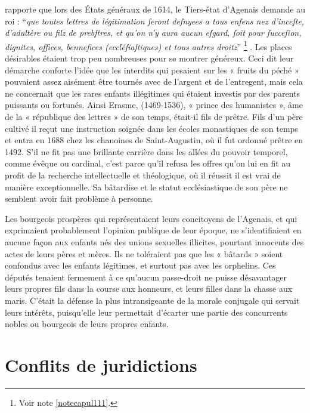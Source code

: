   rapporte que lors des États généraux de 1614, le Tiers-état d'Agenais demande au roi : \enquote{\emph{que toutes lettres de légitimation ſeront deſnyees a tous enfens nez d'inceſte, d'adultère ou filz de prebſtres, et qu'on n'y aura aucun eſgard, ſoit pour ſucceſion, dignites, offices, bennefices (eccléſiaſtiques) et tous autres droitz}}%
\footnote{%
Voir note \ref{notecapul111}.}%
. Les places désirables étaient trop peu nombreuses pour se montrer généreux. Ceci dit leur démarche conforte l'idée que les interdits qui pesaient sur les « fruits du péché » pouvaient assez aisément être tournés avec de l'argent et de l'entregent, mais cela ne concernait que les rares enfants illégitimes qui étaient investis par des parents puissants ou fortunés. Ainsi Erasme, (1469-1536), « prince des humanistes », âme de la « république des lettres » de son temps, était-il fils de prêtre. Fils d'un père cultivé il reçut une instruction soignée dans les écoles monastiques de son temps et entra en 1688 chez les chanoines de Saint-Augustin, où il fut ordonné prêtre en 1492. S'il ne fit pas une brillante carrière dans les allées du pouvoir temporel, comme évêque ou cardinal, c'est parce qu'il refusa les offres qu'on lui en fit au profit de la recherche intellectuelle et théologique, où il réussit il est vrai de manière exceptionnelle. Sa bâtardise et le statut ecclésiastique de son père ne semblent avoir fait problème à personne.

 Les bourgeois prospères qui représentaient leurs concitoyens de l'Agenais, et qui exprimaient probablement l'opinion publique de leur époque, ne s'identifiaient en aucune façon aux enfants nés des unions sexuelles illicites, pourtant innocents des actes de leurs pères et mères. Ils ne toléraient pas que les « bâtards » soient confondus avec les enfants légitimes, et surtout pas avec les orphelins. Ces députés tenaient fermement à ce qu'aucun passe-droit ne puisse désavantager leurs propres fils dans la course aux honneurs, et leurs filles dans la chasse aux maris. C'était la défense la plus intransigeante de la morale conjugale qui servait leurs intérêts, puisqu'elle leur permettait d'écarter une partie des concurrents nobles ou bourgeois de leurs propres enfants.  
 
 

\section{Conflits de juridictions}

